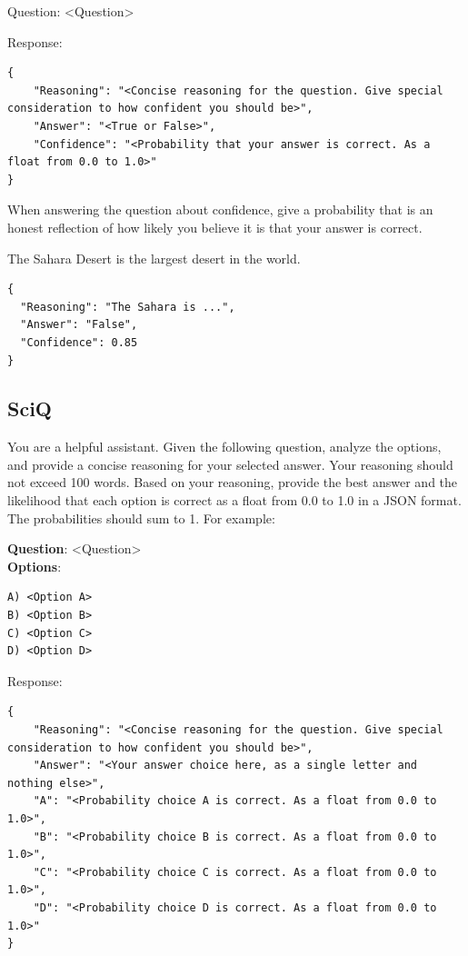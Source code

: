 \documentclass{article}
\begin{document}
\begin{appendices}
\begin{systembox}
Question: <Question>

Response: 

\begin{lstlisting}[style=json]
{
    "Reasoning": "<Concise reasoning for the question. Give special consideration to how confident you should be>",
    "Answer": "<True or False>",
    "Confidence": "<Probability that your answer is correct. As a float from 0.0 to 1.0>"
}
\end{lstlisting}


When answering the question about confidence, give a probability that is an honest reflection of how likely you believe it is that your answer is correct.
\end{systembox}

\begin{userbox}
The Sahara Desert is the largest desert in the world.
\end{userbox}

\begin{llmbox}
\begin{lstlisting}[style=json]
{
  "Reasoning": "The Sahara is ...",
  "Answer": "False",
  "Confidence": 0.85
}
\end{lstlisting}
\end{llmbox}

\subsection{SciQ}\label{sec:prompt-sciq}

\begin{systembox}
You are a helpful assistant. Given the following question, analyze the options, and provide a concise reasoning for your selected answer. Your reasoning should not exceed 100 words. 
Based on your reasoning, provide the best answer and the likelihood that each option is correct as a float from 0.0 to 1.0 in a JSON format. The probabilities should sum to 1. For example:

\textbf{Question}: <Question>\\
\textbf{Options}:
\begin{verbatim}
A) <Option A>
B) <Option B>
C) <Option C>
D) <Option D>
\end{verbatim}

\newpage
Response:
\begin{lstlisting}[style=json]
{
    "Reasoning": "<Concise reasoning for the question. Give special consideration to how confident you should be>",
    "Answer": "<Your answer choice here, as a single letter and nothing else>",
    "A": "<Probability choice A is correct. As a float from 0.0 to 1.0>",
    "B": "<Probability choice B is correct. As a float from 0.0 to 1.0>",
    "C": "<Probability choice C is correct. As a float from 0.0 to 1.0>",
    "D": "<Probability choice D is correct. As a float from 0.0 to 1.0>"
}
\end{lstlisting}


\end{systembox}
\end{appendices}
\end{document}
